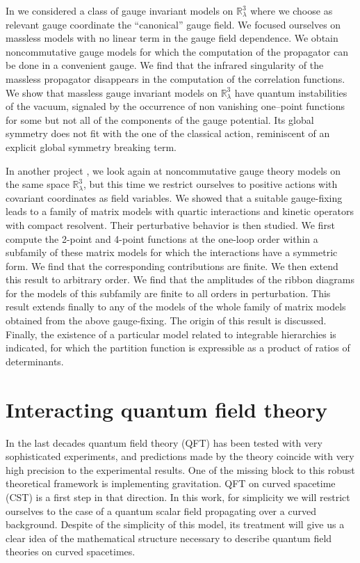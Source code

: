 \documentclass[11pt]{book}
\newcommand{\Rbb}{\mathbb{R}}
\theoremstyle{break}
\begin{document}
In \cite{GVW_2014} we considered a class of gauge invariant models on $\Rbb^3_\lambda$ where we choose as relevant gauge coordinate the ``canonical'' gauge field. We focused ourselves on massless models with no linear term in the gauge field dependence. We obtain noncommutative gauge models for which the computation of the propagator can be done in a convenient gauge. We find that the infrared singularity of the massless propagator disappears in the computation of the correlation functions. We show that massless gauge invariant models on $\Rbb^3_\lambda$ have quantum instabilities of the vacuum, signaled by the occurrence of non vanishing one--point functions for some but not all of the components of the gauge potential. Its global symmetry does not fit with the one of the classical action, reminiscent of an explicit global symmetry breaking term. 


In another project \cite{GJW_2015}, we look again at noncommutative gauge theory models on the same space $\Rbb^3_\lambda$, but this time we restrict ourselves to positive actions with covariant coordinates as field variables. We showed that a suitable gauge-fixing leads to a family of matrix models with quartic interactions and kinetic operators with compact resolvent. Their perturbative behavior is then studied. We first compute the 2-point and 4-point functions at the one-loop order within a subfamily of these matrix models for which the interactions have a symmetric form. We find that the corresponding contributions are finite. We then extend this result to arbitrary order. We find that the amplitudes of the ribbon diagrams for the models of this subfamily are finite to all orders in perturbation. This result extends finally to any of the models of the whole family of matrix models obtained from the above gauge-fixing. The origin of this result is discussed. Finally, the existence of a particular model related to integrable hierarchies is indicated, for which the partition function is expressible as a product of ratios of determinants.\par%


\chapter{Interacting quantum field theory}
\label{p:PAQFT}


In the last decades quantum field theory (QFT) has been tested with very sophisticated experiments, and predictions made by the theory coincide with very high precision to the experimental results. One of the missing block to this robust theoretical framework is implementing gravitation. QFT on curved spacetime (CST) is a first step in that direction. In this work, for simplicity we will restrict ourselves to the case of a quantum scalar field propagating over a curved background. Despite of the simplicity of this model, its treatment will give us a clear idea of the mathematical structure necessary to describe quantum field theories on curved spacetimes.
\end{document}

